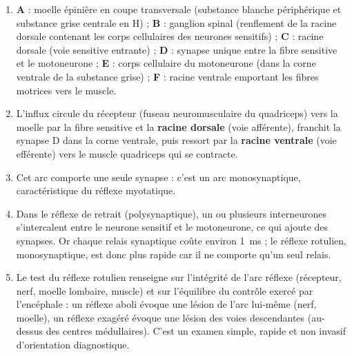 \documentclass[11pt]{article}
\newcommand{\cle}[1]{{\popxbold\color{popdark}#1}}
\begin{document}
\begin{corrige}
\begin{enumerate}
\item \textbf{A} : moelle épinière en coupe transversale (substance blanche périphérique et substance grise centrale en H) ; \textbf{B} : ganglion spinal (renflement de la racine dorsale contenant les corps cellulaires des neurones sensitifs) ; \textbf{C} : racine dorsale (voie sensitive entrante) ; \textbf{D} : synapse unique entre la fibre sensitive et le motoneurone ; \textbf{E} : corps cellulaire du motoneurone (dans la corne ventrale de la substance grise) ; \textbf{F} : racine ventrale emportant les fibres motrices vers le muscle.
\item L'influx circule du \cle{récepteur} (fuseau neuromusculaire du quadriceps) vers la moelle par la fibre sensitive et la \textbf{racine dorsale} (voie afférente), franchit la synapse D dans la corne ventrale, puis ressort par la \textbf{racine ventrale} (voie efférente) vers le muscle quadriceps qui se contracte.
\item Cet arc comporte \cle{une seule synapse} : c'est un arc \cle{monosynaptique}, caractéristique du réflexe \cle{myotatique}.
\item Dans le réflexe de retrait (polysynaptique), un ou plusieurs \cle{interneurones} s'intercalent entre le neurone sensitif et le motoneurone, ce qui ajoute des synapses. Or chaque relais synaptique coûte environ \SI{1}{ms} ; le réflexe rotulien, monosynaptique, est donc plus rapide car il ne comporte qu'un seul relais.
\item Le test du réflexe rotulien renseigne sur l'\cle{intégrité de l'arc réflexe} (récepteur, nerf, moelle lombaire, muscle) et sur l'équilibre du contrôle exercé par l'encéphale : un réflexe aboli évoque une lésion de l'arc lui-même (nerf, moelle), un réflexe exagéré évoque une lésion des voies descendantes (au-dessus des centres médullaires). C'est un examen simple, rapide et non invasif d'orientation diagnostique.
\end{enumerate}
\end{corrige}
\end{document}
